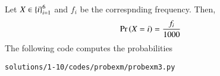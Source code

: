 Let $X \in \left\{i\right\}_{i=1}^{6}$ and $f_i$ be the correspnding frequency.  Then, 
\begin{align}
\Pr\left(X=i\right) &= \frac{f_i}{1000}
\end{align}
The following code computes the probabilities
\begin{lstlisting}
solutions/1-10/codes/probexm/probexm3.py
\end{lstlisting}
